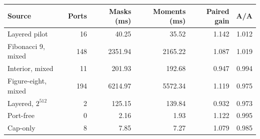 \begin{center}
\small
\begin{tabular}{lrrrrr}
\toprule
Source & Ports & Masks (ms) & Moments (ms) & Paired gain & A/A \\
\midrule
Layered pilot & 16 & 40.25 & 35.52 & 1.142 & 1.012 \\
Fibonacci 9, mixed & 148 & 2351.94 & 2165.22 & 1.087 & 1.019 \\
Interior, mixed & 11 & 201.93 & 192.68 & 0.947 & 0.994 \\
Figure-eight, mixed & 194 & 6214.97 & 5572.34 & 1.119 & 0.975 \\
Layered, $2^{512}$ & 2 & 125.15 & 139.84 & 0.932 & 0.973 \\
Port-free & 0 & 2.16 & 1.93 & 1.122 & 0.995 \\
Cap-only & 8 & 7.85 & 7.27 & 1.079 & 0.985 \\
\bottomrule
\end{tabular}
\end{center}
